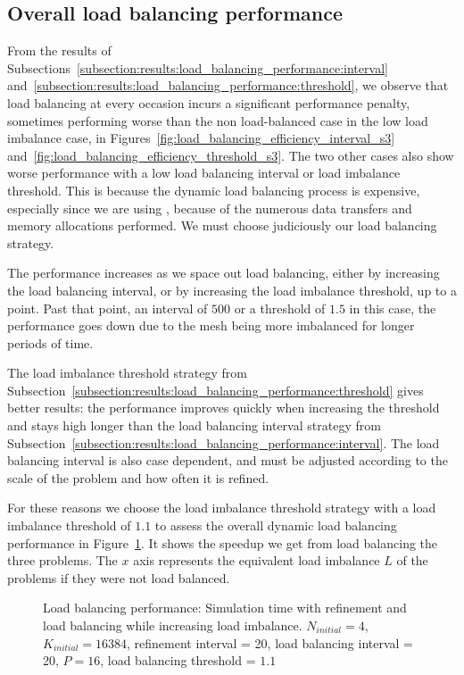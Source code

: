 \subsection{Overall load balancing performance}\label{subsection:results:load_balancing_performance:overall}

From the results of Subsections~\ref{subsection:results:load_balancing_performance:interval}
and~\ref{subsection:results:load_balancing_performance:threshold}, we observe that load balancing at
every occasion incurs a significant performance penalty, sometimes performing worse than the non
load-balanced case in the low load imbalance case, in
Figures~\ref{fig:load_balancing_efficiency_interval_s3}
and~\ref{fig:load_balancing_efficiency_threshold_s3}. The two other cases also show worse
performance with a low load balancing interval or load imbalance threshold. This is because the
dynamic load balancing process is expensive, especially since we are using ,
because of the numerous data transfers and memory allocations performed. We must choose judiciously
our load balancing strategy.

The performance increases as we space out load balancing, either by increasing the load balancing
interval, or by increasing the load imbalance threshold, up to a point. Past that point, an interval
of \(500\) or a threshold of \(1.5\) in this case, the performance goes down due to the mesh being
more imbalanced for longer periods of time.

The load imbalance threshold strategy from
Subsection~\ref{subsection:results:load_balancing_performance:threshold} gives better results: the
performance improves quickly when increasing the threshold and stays high longer than the load
balancing interval strategy from
Subsection~\ref{subsection:results:load_balancing_performance:interval}. The load balancing interval
is also case dependent, and must be adjusted according to the scale of the problem and how often it
is refined.

For these reasons we choose the load imbalance threshold strategy with a load imbalance threshold of
\(1.1\) to assess the overall dynamic load balancing performance in
Figure~\ref{fig:load_balancing_efficiency}. It shows the speedup we get from load balancing the
three problems. The \(x\) axis represents the equivalent load imbalance \(L\) of the problems if
they were not load balanced.

\begin{figure}[H]
    \centering
    
    \caption{Load balancing performance: Simulation time with refinement and load balancing while increasing load imbalance. \(N_{initial} = 4\), \(K_{initial} = 16384\), refinement interval = 20, load balancing interval = 20, \(P = 16\), load balancing threshold = \(1.1\)}\label{fig:load_balancing_efficiency}
\end{figure}

